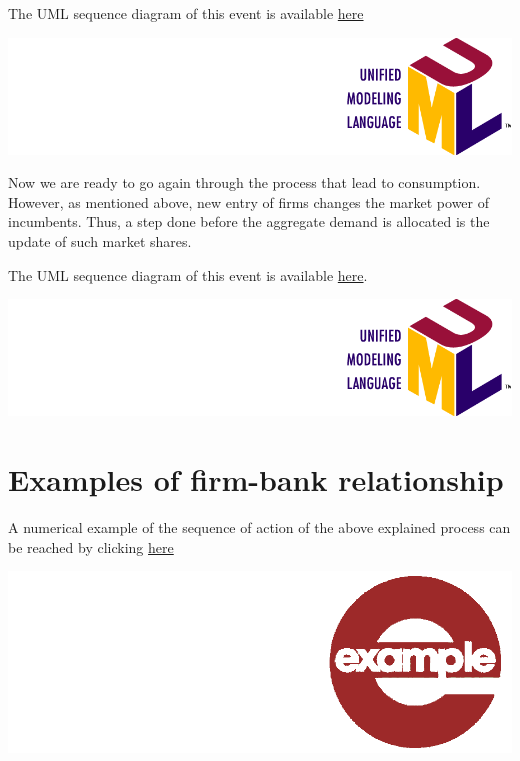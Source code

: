 \documentclass{book}
\newcommand{\umllocation}{file:///Users/giulioni/Dropbox/svn/sfcabm_my/documentation}
\begin{document}
\vskip3mm
The UML sequence diagram of this event is available \href{\umllocation/makeProduction.html}{here}
\begin{marginfigure}
	\includegraphics[scale=0.1]{uml.png}
\end{marginfigure}
\vskip3mm



Now we are ready to go again through the process that lead to consumption. However, as mentioned above, new entry of firms changes the market power of incumbents. Thus, a step done before the aggregate demand is allocated is the update of such market shares.   


\vskip3mm
The UML sequence diagram of this event is available \href{\umllocation/setupNewFirmsToComputeProductAttractiveness.html}{here}.
\begin{marginfigure}
	\includegraphics[scale=0.1]{uml.png}
\end{marginfigure}
\vskip3mm


\section*{Examples of firm-bank relationship}

A numerical example of the sequence of action of the above explained process can be reached by clicking \href{\umllocation/example_firm_bad_conditions.html}{here}
\begin{marginfigure}
\hskip8mm	\includegraphics[scale=0.07]{example.png}
\end{marginfigure}
\end{document}
